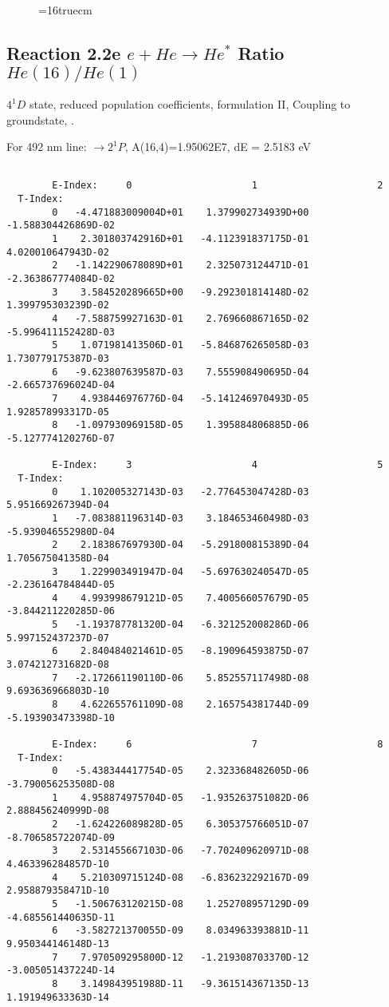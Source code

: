 \documentclass[12pt,dvipdfmx]{article}
\begin{document}
\begin{figure} \label{2.2d}
\epsfxsize=16truecm
\end{figure}
\newpage


\subsection{
  Reaction 2.2e $e + He \rightarrow He^*  $ Ratio $He(16)/He(1)$
}

  $4^1D$ state,
  reduced population coefficients, formulation II,
  Coupling to groundstate, \cite{kn:Fujimoto} .

  For 492 nm line: $\rightarrow 2^1P$, A(16,4)=1.95062E7, dE = 2.5183 eV

\begin{small}\begin{verbatim}

        E-Index:     0                     1                     2
  T-Index:
        0   -4.471883009004D+01    1.379902734939D+00   -1.588304426869D-02
        1    2.301803742916D+01   -4.112391837175D-01    4.020010647943D-02
        2   -1.142290678089D+01    2.325073124471D-01   -2.363867774084D-02
        3    3.584520289665D+00   -9.292301814148D-02    1.399795303239D-02
        4   -7.588759927163D-01    2.769660867165D-02   -5.996411152428D-03
        5    1.071981413506D-01   -5.846876265058D-03    1.730779175387D-03
        6   -9.623807639587D-03    7.555908490695D-04   -2.665737696024D-04
        7    4.938446976776D-04   -5.141246970493D-05    1.928578993317D-05
        8   -1.097930969158D-05    1.395884806885D-06   -5.127774120276D-07

        E-Index:     3                     4                     5
  T-Index:
        0    1.102005327143D-03   -2.776453047428D-03    5.951669267394D-04
        1   -7.083881196314D-03    3.184653460498D-03   -5.939046552980D-04
        2    2.183867697930D-04   -5.291800815389D-04    1.705675041358D-04
        3    1.229903491947D-04   -5.697630240547D-05   -2.236164784844D-05
        4    4.993998679121D-05    7.400566057679D-05   -3.844211220285D-06
        5   -1.193787781320D-04   -6.321252008286D-06    5.997152437237D-07
        6    2.840484021461D-05   -8.190964593875D-07    3.074212731682D-08
        7   -2.172661190110D-06    5.852557117498D-08    9.693636966803D-10
        8    4.622655761109D-08    2.165754381744D-09   -5.193903473398D-10

        E-Index:     6                     7                     8
  T-Index:
        0   -5.438344417754D-05    2.323368482605D-06   -3.790056253508D-08
        1    4.958874975704D-05   -1.935263751082D-06    2.888456240999D-08
        2   -1.624226089828D-05    6.305375766051D-07   -8.706585722074D-09
        3    2.531455667103D-06   -7.702409620971D-08    4.463396284857D-10
        4    5.210309715124D-08   -6.836232292167D-09    2.958879358471D-10
        5   -1.506763120215D-08    1.252708957129D-09   -4.685561440635D-11
        6   -3.582721370055D-09    8.034963393881D-11    9.950344146148D-13
        7    7.970509295800D-12   -1.219308703370D-12   -3.005051437224D-14
        8    3.149843951988D-11   -9.361514367135D-13    1.191949633363D-14


\end{verbatim}
\end{small}
\end{document}
